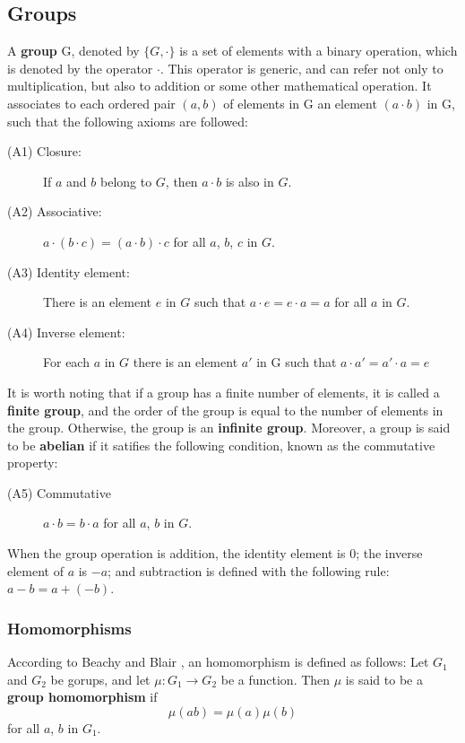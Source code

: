 \subsection{Groups}

A \textbf{group} G, denoted by $\{ G, \cdot \}$ is a set of elements with a binary operation, which is denoted by the operator $\cdot$. This operator is generic, and can refer not only to multiplication, but also to addition or some other mathematical operation. It associates to each ordered pair $(a, b)$ of elements in G an element $(a \cdot b)$ in G, such that the following axioms are followed:
\begin{description}
  \item[(A1) Closure:] If $a$ and $b$ belong to $G$, then $a \cdot b$ is also in $G$.
  \item[(A2) Associative:] $a \cdot (b \cdot c) = (a \cdot b) \cdot c $ for all $a$, $b$, $c$ in $G$.
  \item[(A3) Identity element:] There is an element $e$ in $G$ such that $a \cdot e = e \cdot a = a$ for all $a$ in $G$.
  \item[(A4) Inverse element:] For each $a$ in $G$ there is an element $a'$ in G such that $a \cdot a' = a' \cdot a = e$ 
\end{description}
It is worth noting that if a group has a finite number of elements, it is called a \textbf{finite group}, and the order of the group is equal to the number of elements in the group. Otherwise, the group is an \textbf{infinite group}. Moreover, a group is said to be \textbf{abelian} if it satifies the following condition, known as the commutative property:
\begin{description}
  \item[(A5) Commutative] $a \cdot b = b \cdot a$ for all $a$, $b$ in $G$.
\end{description}

When the group operation is addition, the identity element is 0; the inverse element of $a$ is $-a$; and subtraction is defined with the following rule: $a-b = a+(-b)$. 

\subsubsection{Homomorphisms}

According to Beachy and Blair \cite{beachy2006abstract}, an homomorphism is defined as follows: Let $G_{1}$ and $G_{2}$ be gorups, and let $\mu: G_{1} \rightarrow G_{2}$ be a function. Then $\mu$ is said to be a \textbf{group homomorphism} if
\begin{equation}
\mu(ab) = \mu(a)\mu(b)
\end{equation}
for all $a$, $b$ in $G_{1}$.
 
